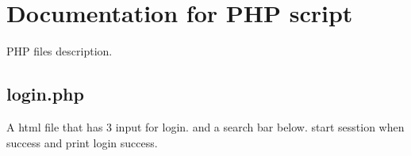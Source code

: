 \section{Documentation for PHP script}

PHP files description.

\subsection{login.php}

A html file that has 3 input for login. and a search bar below.
start sesstion when success and print login success.
